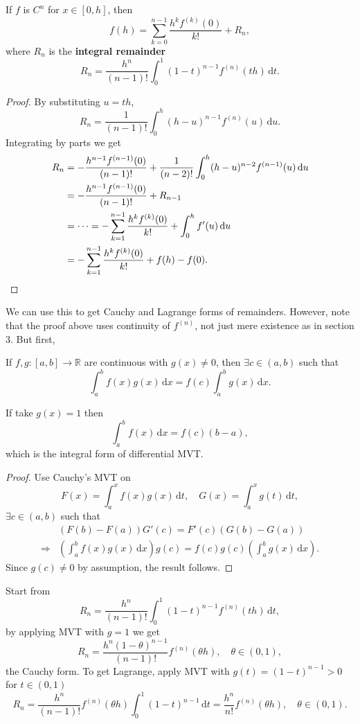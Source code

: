 \begin{theorem}
    If $f$ is $C^n$ for $ x\in [0,h] $, then 
    \[
        f(h) = \sum_{k=0}^{n-1}\frac{h^k f^{(k)}(0)}{k!} + R_n,
    \]
    where $ R_n $ is the \textbf{integral remainder}
    \[
        R_n = \frac{h^n}{(n-1)!}\int_{0}^{1} (1-t)^{n-1}f^{(n)}(th) \,\mathrm{d}t.
    \]
\end{theorem}
\begin{proof}
    By substituting $ u=th $, 
    \[
        R_n = \frac{1}{(n-1)!}\int_{0}^{h} (h-u)^{n-1}f^{(n)}(u) \,\mathrm{d}u .
    \]
    Integrating by parts we get 
    \begin{align*}
        R_n&= -\frac{h^{n-1}f^{(n-1)}(0)}{(n-1)!}+\frac{1}{(n-2)!} \int_{0}^{h} (h-u)^{n-2}f^{(n-1)}(u) \,\mathrm{d}u\\ &= -\frac{h^{n-1}f^{(n-1)}(0)}{(n-1)!}+R_{n-1}\\ 
        &= \cdots = - \sum_{k=1}^{n-1}\frac{h^kf^{(k)}(0)}{k!} + \int_{0}^{h} f'(u) \,\mathrm{d}u\\ 
        &= - \sum_{k=1}^{n-1}\frac{h^kf^{(k)}(0)}{k!} +f(h)-f(0).\qedhere
    \end{align*}
\end{proof}
We can use this to get Cauchy and Lagrange forms of remainders. However, note that the proof above uses continuity of $f^{(n)}$, not just mere existence as in section 3. But first,
\begin{theorem}
    If $ f,g:[a,b]\to \mathbb{R}  $ are continuous with $ g(x)\neq 0 $, then $ \exists c\in (a,b) $ such that 
    \[
        \int_{a}^{b} f(x)g(x) \,\mathrm{d}x = f(c) \int_{a}^{b} g(x) \,\mathrm{d}x.
    \]
\end{theorem}
\begin{note}
    If take $ g(x)=1 $ then 
    \[
        \int_{a}^{b} f(x) \,\mathrm{d}x = f(c)(b-a),
    \]
    which is the integral form of differential MVT.
\end{note}
\begin{proof}
    Use Cauchy's MVT on 
    \[
        F(x) = \int_{a}^{x} f(x)g(x) \,\mathrm{d}t,\quad G(x)=\int_{a}^{x} g(t) \,\mathrm{d}t,
    \]
    $ \exists c\in (a,b) $ such that 
    \begin{align*}
        &(F(b)-F(a))G'(c)=F'(c)(G(b)-G(a))\\ 
        \Longrightarrow & \left( \int_{a}^{b} f(x)g(x) \,\mathrm{d}x \right)g(c)=f(c)g(c)\left( \int_{a}^{b} g(x) \,\mathrm{d}x \right).
    \end{align*}
    Since $g(c)\neq 0$ by assumption, the result follows.
\end{proof}

Start from 
\[
    R_n = \frac{h^n}{(n-1)!}\int_{0}^{1} (1-t)^{n-1}f^{(n)}(th) \,\mathrm{d}t,
\]
by applying MVT with $g=1$ we get
\[
    R_n = \frac{h^n (1-\theta)^{n-1}}{(n-1)!}f^{(n)}(\theta h),\quad \theta\in (0,1),
\]
the Cauchy form. To get Lagrange, apply MVT with $ g(t)=(1-t)^{n-1}>0 $ for $ t\in (0,1)$
\[
    R_n=\frac{h^n}{(n-1)!} f^{(n)}(\theta h) \int_{0}^{1} (1-t)^{n-1} \,\mathrm{d}t = \frac{h^n }{n!}f^{(n)}(\theta h),\quad \theta\in (0,1). 
\]